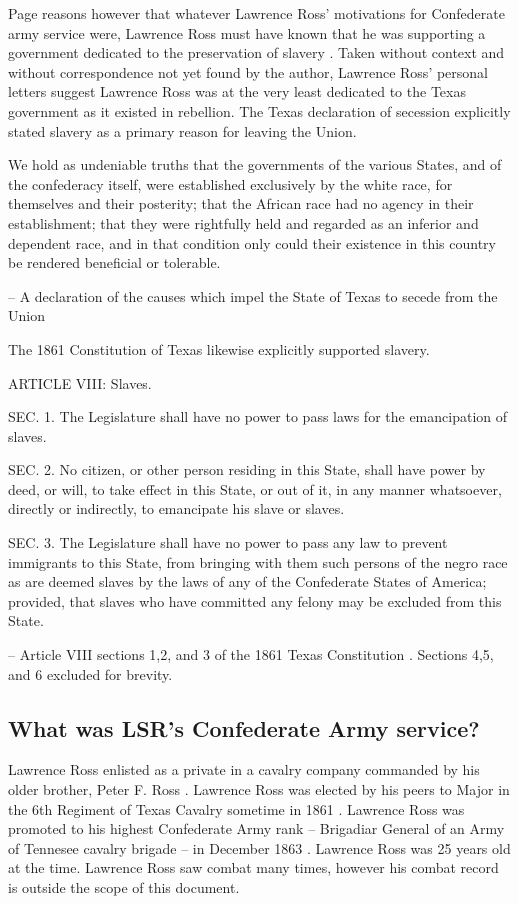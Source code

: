 \documentclass[12pt]{article}
\begin{document}
Page reasons however that whatever Lawrence Ross' motivations for Confederate army service were, Lawrence Ross must have known that he was supporting a government dedicated to the preservation of slavery \cite[pg. 59]{page}. Taken without context and without correspondence not yet found by the author, Lawrence Ross' personal letters suggest Lawrence Ross was at the very least dedicated to the Texas government as it existed in rebellion. The Texas declaration of secession explicitly stated slavery as a primary reason for leaving the Union.
\begin{displayquote}
We hold as undeniable truths that the governments of the various States, and of the confederacy itself, were established exclusively by the white race, for themselves and their posterity; that the African race had no agency in their establishment; that they were rightfully held and regarded as an inferior and dependent race, and in that condition only could their existence in this country be rendered beneficial or tolerable.

-- A declaration of the causes which impel the State of Texas to secede from the Union \cite{tx:secede}
\end{displayquote}

The 1861 Constitution of Texas likewise explicitly supported slavery.
\begin{displayquote}
ARTICLE VIII: Slaves.

SEC. 1. The Legislature shall have no power to pass laws for the emancipation of slaves.

SEC. 2. No citizen, or other person residing in this State, shall have power by deed, or will, to take effect in this State, or out of it, in any manner whatsoever, directly or indirectly, to emancipate his slave or slaves.

SEC. 3. The Legislature shall have no power to pass any law to prevent immigrants to this State, from bringing with them such persons of the negro race as are deemed slaves by the laws of any of the Confederate States of America; provided, that slaves who have committed any felony may be excluded from this State.

-- Article VIII sections 1,2, and 3 of the 1861 Texas Constitution \cite{tx:1861constitution}. Sections 4,5, and 6 excluded for brevity.
\end{displayquote}

\newpage
\subsection{What was LSR's Confederate Army service?}
Lawrence Ross enlisted as a private in a cavalry company commanded by his older brother, Peter F. Ross \cite{rosspapersummary}. Lawrence Ross was elected by his peers to Major in the 6th Regiment of Texas Cavalry sometime in 1861 \cite[pg. 36--37]{texasbrigade}. Lawrence Ross was promoted to his highest Confederate Army rank -- Brigadiar General of an Army of Tennesee cavalry brigade -- in December 1863 \cite{rosspapersummary}. Lawrence Ross was 25 years old at the time. Lawrence Ross saw combat many times, however his combat record is outside the scope of this document. 
\end{document}
